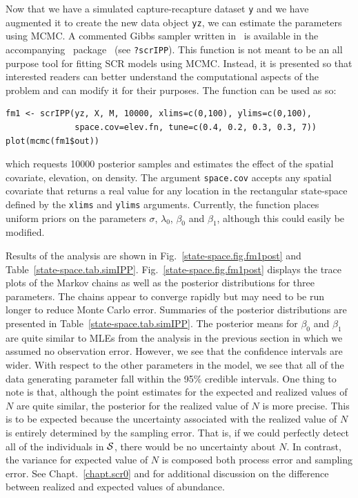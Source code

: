 Now that we have a simulated capture-recapture dataset \texttt{y} and we have
augmented it to create the new data object \texttt{yz}, we can
estimate the parameters using MCMC.  A commented Gibbs sampler written
in \R~is available in the accompanying \R~package \scrbook~(see
\texttt{?scrIPP}). This function is not meant to be an all purpose
tool for fitting SCR models using MCMC. Instead, it is presented so
that interested readers can better understand the computational
aspects of the problem and can modify it for their purposes.
The function can be used as so:
\begin{small}
\begin{verbatim}
fm1 <- scrIPP(yz, X, M, 10000, xlims=c(0,100), ylims=c(0,100),
              space.cov=elev.fn, tune=c(0.4, 0.2, 0.3, 0.3, 7))
plot(mcmc(fm1$out))
\end{verbatim}
\end{small}
which requests 10000 posterior samples and estimates the effect of the
spatial covariate, elevation, on density.
The argument \verb+space.cov+ accepts any spatial
covariate that returns a real value for any location in the
rectangular state-space defined by the \verb+xlims+ and \verb+ylims+
arguments. Currently, the function
places uniform priors on the parameters $\sigma$, $\lambda_0$,
$\beta_0$ and $\beta_1$, although this could easily be modified.

Results of the analysis are shown in
Fig.~\ref{state-space.fig.fm1post} and
Table~\ref{state-space.tab.simIPP}.
Fig.~\ref{state-space.fig.fm1post}
displays the trace plots of the Markov chains as well as the posterior
distributions for three parameters. The chains appear to
converge rapidly but may need to be run longer to reduce Monte Carlo
error. Summaries of the posterior distributions are presented in
Table~\ref{state-space.tab.simIPP}. The posterior means for $\beta_0$
and $\beta_1$ are quite similar to MLEs from the analysis in the
previous section in which we assumed no observation error. However, we
see that the confidence intervals are wider. With respect to the other
parameters in the model, we see that all of the data
generating parameter fall within the 95\% credible intervals. One
thing to note is that, although the point estimates for
the expected and realized values of $N$ are quite similar, the
posterior for the realized value of $N$ is more precise. This is to be
expected because the uncertainty associated with the realized value of
$N$ is entirely determined by the sampling error. That is,
if we could perfectly detect all of the individuals in $\cal S$, there
would be no uncertainty about $N$. In contrast, the variance for
expected value of $N$ is composed both process error and sampling
error. See Chapt.~\ref{chapt.scr0} and
\citet{efford_fewster:2012} for additional discussion on the
difference between realized and expected values of abundance.


